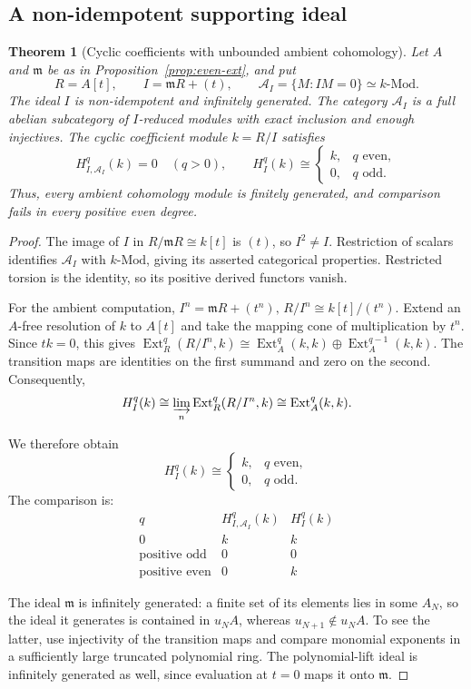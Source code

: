 \documentclass[11pt,reqno]{amsart}
\newtheorem{theorem}{Theorem}[section]
\theoremstyle{definition}
\theoremstyle{remark}
\newcommand{\Mod}{\text{-}\mathrm{Mod}}
\newcommand{\Ext}{\operatorname{Ext}}
\newcommand{\A}{\mathcal A_I}
\begin{document}
\subsection{A non-idempotent supporting ideal}

\begin{theorem}[Cyclic coefficients with unbounded ambient cohomology]\label{thm:unbounded}
Let $A$ and $\mathfrak m$ be as in Proposition~\ref{prop:even-ext}, and put
\[
R=A[t],\qquad I=\mathfrak mR+(t),\qquad
\A=\{M:IM=0\}\simeq k\Mod.
\]
The ideal $I$ is non-idempotent and infinitely generated. The category $\A$ is a full abelian subcategory of $I$-reduced modules with exact inclusion and enough injectives. The cyclic coefficient module $k=R/I$ satisfies
\[
H_{I,\A}^q(k)=0\quad(q>0),\qquad
H_I^q(k)\cong
\begin{cases}k,&q\text{ even},\\0,&q\text{ odd}.\end{cases}
\]
Thus, every ambient cohomology module is finitely generated, and comparison fails in every positive even degree.
\end{theorem}
\begin{proof}
The image of $I$ in $R/\mathfrak mR\cong k[t]$ is $(t)$, so $I^2\ne I$. Restriction of scalars identifies $\A$ with $k\Mod$, giving its asserted categorical properties. Restricted torsion is the identity, so its positive derived functors vanish.

For the ambient computation,
\(I^n=\mathfrak mR+(t^n)\text{, } R/I^n\cong k[t]/(t^n).\)
Extend an $A$-free resolution of $k$ to $A[t]$ and
take the mapping cone of multiplication by $t^n$.
Since $tk=0$, this gives
\(\Ext_R^q(R/I^n,k)\cong\Ext_A^q(k,k)\oplus\Ext_A^{q-1}(k,k).\)
The transition maps are identities on the first summand
and zero on the second. Consequently,
\[
H_I^q(k)
\cong
\varinjlim_n\Ext_R^q(R/I^n,k)
\cong
\Ext_A^q(k,k).
\]

We therefore obtain
\[
H_I^q(k)\cong
\begin{cases}
k,&q\text{ even},\\
0,&q\text{ odd}.
\end{cases}
\]
The comparison is:
\[
\begin{array}{c|c|c}
q&H^q_{I,\A}(k)&H_I^q(k)\\ \hline
0&k&k\\
\text{positive odd}&0&0\\
\text{positive even}&0&k
\end{array}
\]

The ideal $\mathfrak m$ is infinitely generated: a finite set of its elements lies in some $A_N$, so the ideal it generates is contained in $u_NA$, whereas $u_{N+1}\notin u_NA$. To see the latter, use injectivity of the transition maps and compare monomial exponents in a sufficiently large truncated polynomial ring. The polynomial-lift ideal is infinitely generated as well, since evaluation at $t=0$ maps it onto $\mathfrak m$.
\end{proof}
\end{document}
